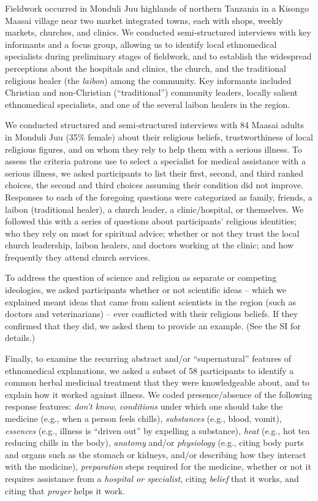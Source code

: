 \documentclass[
  11pt,
]{article}
\begin{document}
Fieldwork occurred in Monduli Juu highlands of northern Tanzania in a Kisongo Maasai village near two market integrated towns, each with shops, weekly markets, churches, and clinics. We conducted semi-structured interviews with key informants and a focus group, allowing us to identify local ethnomedical specialists during preliminary stages of fieldwork, and to establish the widespread perceptions about the hospitals and clinics, the church, and the traditional religious healer (the \emph{laibon}) among the community. Key informants included Christian and non-Christian (``traditional'') community leaders, locally salient ethnomedical specialists, and one of the several laibon healers in the region.

We conducted structured and semi-structured interviews with 84 Maasai adults in Monduli Juu (35\% female) about their religious beliefs, trustworthiness of local religious figures, and on whom they rely to help them with a serious illness. To assess the criteria patrons use to select a specialist for medical assistance with a serious illness, we asked participants to list their first, second, and third ranked choices, the second and third choices assuming their condition did not improve. Responses to each of the foregoing questions were categorized as family, friends, a laibon (traditional healer), a church leader, a clinic/hospital, or themselves. We followed this with a series of questions about participants' religious identities; who they rely on most for spiritual advice; whether or not they trust the local church leadership, laibon healers, and doctors working at the clinic; and how frequently they attend church services.

To address the question of science and religion as separate or competing ideologies, we asked participants whether or not scientific ideas -- which we explained meant ideas that came from salient scientists in the region (such as doctors and veterinarians) -- ever conflicted with their religious beliefs. If they confirmed that they did, we asked them to provide an example. (See the SI for details.)

Finally, to examine the recurring abstract and/or ``supernatural'' features of ethnomedical explanations, we asked a subset of 58 participants to identify a common herbal medicinal treatment that they were knowledgeable about, and to explain how it worked against illness. We coded presence/absence of the following response features: \emph{don't know}, \emph{conditions} under which one should take the medicine (e.g., when a person feels chills), \emph{substances} (e.g., blood, vomit), \emph{essences} (e.g., illness is ``driven out'' by expelling a substance), \emph{heat} (e.g., hot tea reducing chills in the body), \emph{anatomy} and/or \emph{physiology} (e.g., citing body parts and organs such as the stomach or kidneys, and/or describing how they interact with the medicine), \emph{preparation} steps required for the medicine, whether or not it requires assistance from a \emph{hospital or specialist}, citing \emph{belief} that it works, and citing that \emph{prayer} helps it work.
\end{document}

